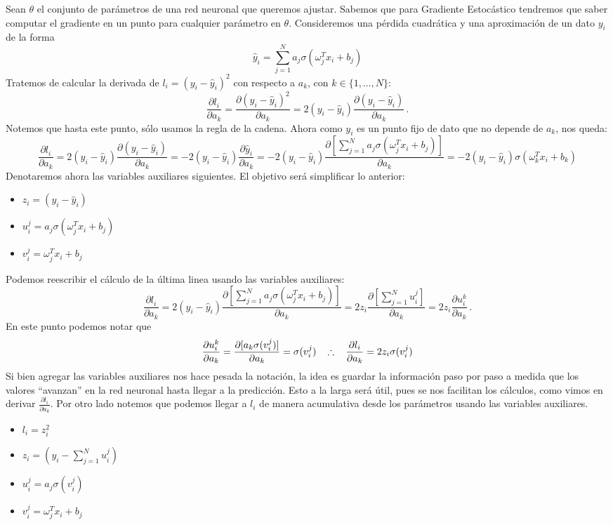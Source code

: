 \newp Sean $\theta$ el conjunto de parámetros de una red neuronal que queremos ajustar. Sabemos que para Gradiente Estocástico tendremos que saber computar el gradiente en un punto para cualquier parámetro en $\theta$. Consideremos una pérdida cuadrática y una aproximación de un dato $y_i$ de la forma
$$ \hat y_i = \displaystyle \sum^N_{j=1} a_j\sigma(\omega^T_j x_i+b_j) $$
Tratemos de calcular la derivada de $l_i=(y_i-\hat y_i)^2$ con respecto a $a_k$, con $k\in\{1,\dots,N\}$:
$$ \frac{\partial l_i}{\partial a_k} = \frac{\partial (y_i-\hat y_i)^2}{\partial a_k} = 2(y_i-\hat y_i) \frac{\partial (y_i-\hat y_i)}{\partial a_k} \,.$$
Notemos que hasta este punto, sólo usamos la regla de la cadena. Ahora como $y_i$ es un punto fijo de dato que no depende de $a_k$, nos queda:
$$ \frac{\partial l_i}{\partial a_k} = 2(y_i-\hat y_i) \frac{\partial (y_i-\hat y_i)}{\partial a_k} =  -2(y_i-\hat y_i) \frac{\partial\hat y_i}{\partial a_k} =  -2(y_i-\hat y_i) \frac{\partial[\sum^N_{j=1} a_j\sigma(\omega^T_j x_i+b_j)]}{\partial a_k} = -2(y_i-\hat y_i)\sigma(\omega_k^Tx_i+b_k)$$
Denotaremos ahora las variables auxiliares siguientes. El objetivo será simplificar lo anterior:
\begin{itemize}
    \item $z_i = (y_i-\hat y_i)$
    \item $u^j_i = a_j\sigma(\omega^T_j x_i+b_j)$
    \item $v^j_i = \omega^T_j x_i+b_j$
\end{itemize}
Podemos reescribir el cálculo de la última linea usando las variables auxiliares:
$$ \frac{\partial l_i}{\partial a_k} = 2(y_i-\hat y_i) \frac{\partial[\sum^N_{j=1} a_j\sigma(\omega^T_j x_i+b_j)]}{\partial a_k} = 2z_i \frac{\partial[\sum^N_{j=1} u^j_i]}{\partial a_k} = 2z_i \frac{\partial u_i^k}{\partial a_k} \,.$$
En este punto podemos notar que 
$$ \frac{\partial u_i^k}{\partial a_k} = \frac{\partial[a_k \sigma(v_i^j)]}{\partial a_k} = \sigma(v_i^j) \hspace{.25cm}\, \therefore \hspace{.25cm}\, \frac{\partial l_i}{\partial a_k}=2z_i \sigma(v_i^j)$$
Si bien agregar las variables auxiliares nos hace pesada la notación, la idea es guardar la información paso por paso a medida que los valores ``avanzan'' en la red neuronal hasta llegar a la predicción. Esto a la larga será útil, pues se nos facilitan los cálculos, como vimos en derivar $\frac{\partial l_i}{\partial a_k}$. Por otro lado notemos que podemos llegar a $l_i$ de manera acumulativa desde los parámetros usando las variables auxiliares.
\begin{itemize}
    \item $l_i = z_i^2$
    \item $z_i = (y_i-\sum^N_{j=1}u_i^j)$
    \item $u^j_i = a_j\sigma(v_i^j)$
    \item $v_i^j = \omega^T_j x_i+b_j$
\end{itemize}

